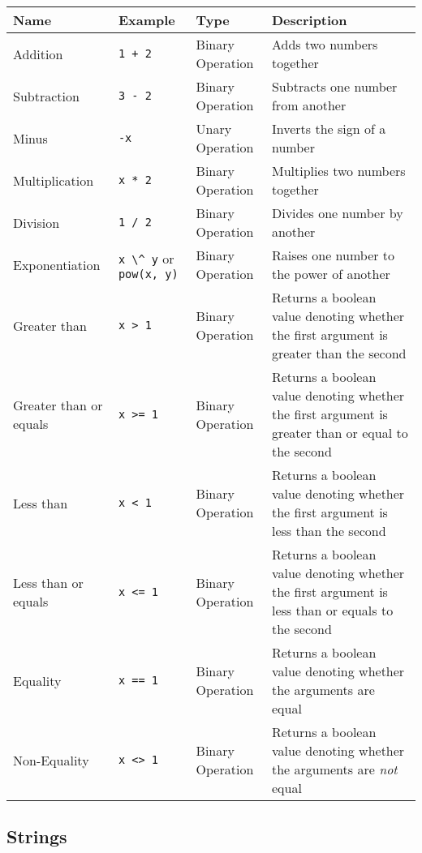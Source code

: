\documentclass[11pt]{article}
\newcommand{\literal}[1]{\lstinline[style=DSL,identifierstyle=\itshape]!#1!}
\begin{document}
\begin{center}
\begin{tabular}{|l|l|l|p{3.5in}|}
\hline
Name & Example & Type & Description\\
\hline
Addition & \literal{1 + 2} & Binary Operation & Adds two numbers together\\
\hline
Subtraction & \literal{3 - 2} & Binary Operation & Subtracts one number from another\\
\hline
Minus & \literal{-x} & Unary Operation & Inverts the sign of a number\\
\hline
Multiplication & \literal{x * 2} & Binary Operation & Multiplies two numbers together\\
\hline
Division & \literal{1 / 2} & Binary Operation & Divides one number by another\\
\hline
Exponentiation & \literal{x \^ y} or \literal{pow(x, y)} & Binary Operation & Raises one number to the power of another\\
\hline
Greater than & \literal{x > 1} & Binary Operation & Returns a boolean value denoting whether the first argument is greater than the second\\
\hline
Greater than or equals & \literal{x >= 1} & Binary Operation & Returns a boolean value denoting whether the first argument is greater than or equal to the second\\
\hline
Less than & \literal{x < 1} & Binary Operation & Returns a boolean value denoting whether the first argument is less than the second\\
\hline
Less than or equals & \literal{x <= 1} & Binary Operation & Returns a boolean value denoting whether the first argument is less than or equals to the second\\
\hline
Equality & \literal{x == 1} & Binary Operation & Returns a boolean value denoting whether the arguments are equal\\
\hline
Non-Equality & \literal{x <> 1} & Binary Operation & Returns a boolean value denoting whether the arguments are {\it not} equal\\
\hline
\end{tabular}
\end{center}

\subsection {Strings}
\end{document}
